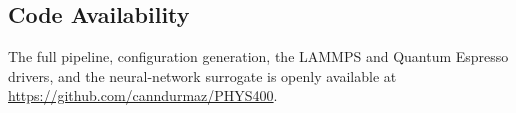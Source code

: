 \subsection{Code Availability}

The full pipeline, configuration generation, the LAMMPS and Quantum Espresso
drivers, and the neural-network surrogate is openly
available at \url{https://github.com/canndurmaz/PHYS400}.
